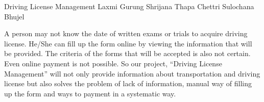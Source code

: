 \begin{conf-abstract}[]
 {Driving License Management }
 {Laxmi Gurung
 	Shrijana Thapa Chettri
 	Sulochana Bhujel
 }
{}

A person may not know the date of written exams or trials to acquire driving license. He/She can fill up the form online by viewing the information that will be provided. The criteria of the forms that will be accepted is also not certain. Even online payment is not possible. So our project, “Driving License Management” will not only provide information about transportation and driving license but also solves the problem of lack of information, manual way of filling up the form and ways to payment in a systematic way.
 \end{conf-abstract}